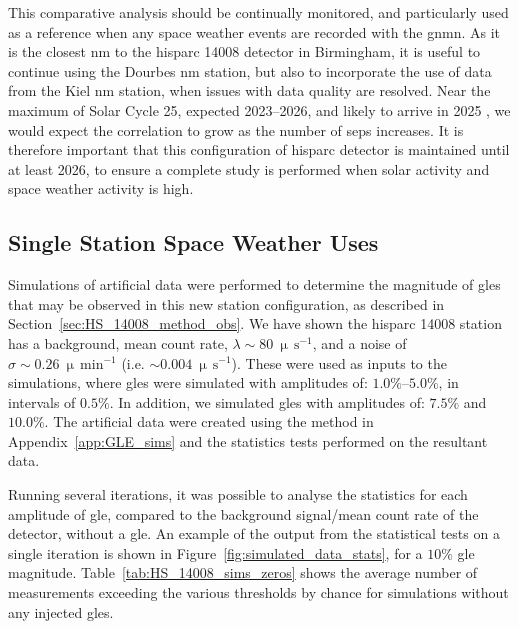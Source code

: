 This comparative analysis should be continually monitored, and particularly used as a reference when any space weather events are recorded with the \gls{gnmn}. As it is the closest \gls{nm} to the \gls{hisparc} 14008 detector in Birmingham, it is useful to continue using the Dourbes \gls{nm} station, but also to incorporate the use of data from the Kiel \gls{nm} station, when issues with data quality are resolved. Near the maximum of Solar Cycle 25, expected 2023--2026, and likely to arrive in 2025 \citep{mcintosh_overlapping_2020, pesnell_lessons_2020}, we would expect the correlation to grow as the number of \glspl{sep} increases. It is therefore important that this configuration of \gls{hisparc} detector is maintained until at least 2026, to ensure a complete study is performed when solar activity and space weather activity is high.


\subsection{Single Station Space Weather Uses}\label{sec:HS_14008_single_sims}

Simulations of artificial data were performed to determine the magnitude of \glspl{gle} that may be observed in this new station configuration, as described in Section~\ref{sec:HS_14008_method_obs}. We have shown the \gls{hisparc} 14008 station has a background, mean count rate, $\lambda\sim80~\upmu \, \mathrm{s}^{-1}$, and a noise of $\sigma\sim0.26~\upmu \, \mathrm{min}^{-1}$ (i.e. $\sim0.004~\upmu \, \mathrm{s}^{-1}$). These were used as inputs to the simulations, where \glspl{gle} were simulated with amplitudes of: $1.0\%$--$5.0\%$, in intervals of $0.5\%$. In addition, we simulated \glspl{gle} with amplitudes of: $7.5\%$ and $10.0\%$. The artificial data were created using the method in Appendix~\ref{app:GLE_sims} and the statistics tests performed on the resultant data.

Running several iterations, it was possible to analyse the statistics for each amplitude of \gls{gle}, compared to the background signal/mean count rate of the detector, without a \gls{gle}. An example of the output from the statistical tests on a single iteration is shown in Figure~\ref{fig:simulated_data_stats}, for a $10 \%$ \gls{gle} magnitude. Table~\ref{tab:HS_14008_sims_zeros} shows the average number of measurements exceeding the various thresholds by chance for simulations without any injected \glspl{gle}.


